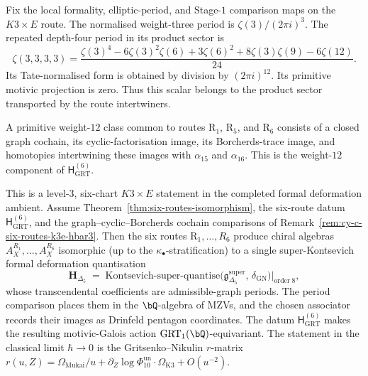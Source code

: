 \begin{remark}
\label{rem:cy-c-six-routes-k3e-hbar3}
Fix the local formality, elliptic-period, and Stage-$1$ comparison
maps on the $K3\times E$ route.  The normalised weight-three period is
$\zeta(3)/(2\pi i)^3$.  The repeated depth-four period in its product
sector is
\[
 \zeta(3,3,3,3)
 =\frac{\zeta(3)^4-6\zeta(3)^2\zeta(6)+3\zeta(6)^2
 +8\zeta(3)\zeta(9)-6\zeta(12)}{24}.
\]
Its Tate-normalised form is obtained by division by
$(2\pi i)^{12}$.
Its primitive motivic projection is zero.  Thus this scalar belongs
to the product sector transported by the route intertwiners.

A primitive weight-$12$ class common to routes R$_1$, R$_5$, and
R$_6$ consists of a closed graph cochain, its cyclic-factorisation
image, its Borcherds-trace image, and homotopies intertwining these
images with $\alpha_{15}$ and $\alpha_{16}$.  This is the
weight-$12$ component of $\mathsf H_{\mathrm{GRT}}^{(6)}$.
\end{remark}

\begin{theorem}
\label{thm:cy-c-six-routes-unified-kontsevich}
This is a level-$3$, six-chart $K3\times E$ statement in the completed
formal deformation ambient.  Assume
Theorem~\ref{thm:six-routes-isomorphism}, the six-route datum
$\mathsf H_{\mathrm{GRT}}^{(6)}$, and the graph--cyclic--Borcherds
cochain comparisons of
Remark~\ref{rem:cy-c-six-routes-k3e-hbar3}.  Then the six routes
R$_1, \ldots, R_6$ produce chiral algebras
$A_X^{R_1}, \ldots, A_X^{R_6}$ isomorphic (up to the
$\kappa_\bullet$-stratification) to a single super-Kontsevich
formal deformation quantisation
\begin{equation}
\label{eq:cy-c-kontsevich-unification}
 \mathbf{H}_{\Delta_5}
 \;=\;
 \mathrm{Kontsevich\mbox{-}super\mbox{-}quantise}\bigl(
 \mathfrak{g}_{\Delta_5}^{\mathrm{super}},\,
 \delta_{\mathrm{GN}}
 \bigr)\bigg|_{\mathrm{order}\;8},
\end{equation}
whose transcendental coefficients are admissible-graph periods.  The
period comparison places them in the $\bQ$-algebra of MZVs, and the
chosen associator records their images as Drinfeld pentagon
coordinates.  The datum $\mathsf H_{\mathrm{GRT}}^{(6)}$ makes the
resulting motivic-Galois action $\mathrm{GRT}_1(\bQ)$-equivariant. The
statement in the classical limit $\hbar\to 0$ is the Gritsenko--Nikulin
$r$-matrix
$r(u, Z) = \Omega_{\mathrm{Mukai}}/u + \partial_Z\log\Phi_{10}^{\mathrm{un}}
\cdot\Omega_{\mathrm{K3}} + O(u^{-2})$.
\end{theorem}

